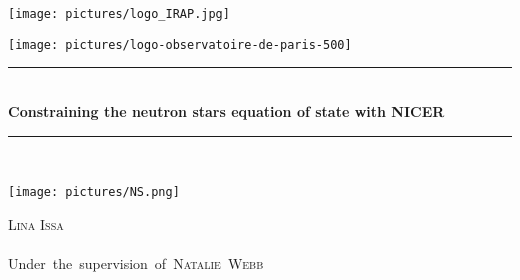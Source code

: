 \documentclass[a4paper, twoside, 12pt]{article}
\numberwithin{equation}{section}
\begin{document}
\thispagestyle{empty}
\begin{center}
\vspace*{50pt}



\newcommand{\HRule}{\rule{\linewidth}{0.5mm}}	
\begin{minipage}{0.40\textwidth}
{}
    \begin{flushleft}

    \texttt{[image: pictures/logo\_IRAP.jpg]}
    \end{flushleft}
\end{minipage}
\begin{minipage}{0.40\textwidth} 
    \begin{flushright}
   \texttt{[image: pictures/logo-observatoire-de-paris-500]}
    \end{flushright}
\end{minipage}






\vspace*{10 pt}

\HRule \\[1 cm]	
{ \huge \bfseries Constraining the neutron stars equation of state with NICER}\\[0.4cm]	 																	
\HRule \\[1cm]	


\begin{center}
\texttt{[image: pictures/NS.png]}
\end{center}
%


\vspace{10pt}

\LARGE \textsc{Lina Issa} \\
\vspace{10 pt}
\\ 

\vspace{10 pt}
\mbox{\LARGE Under the supervision of \textsc{Natalie Webb} %
}


\end{center}
\end{document}
